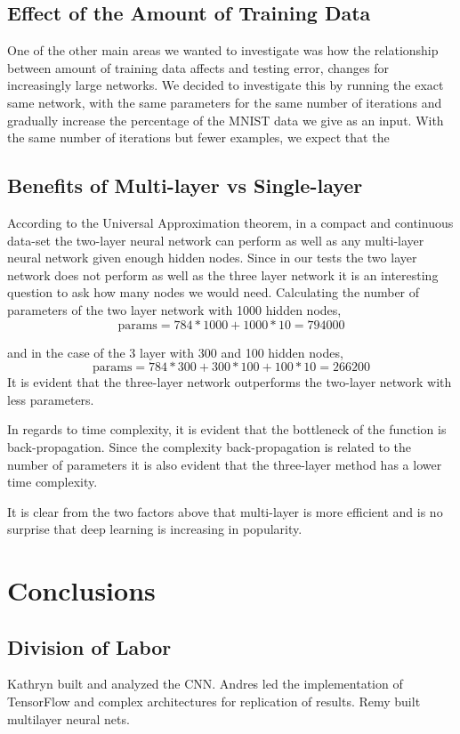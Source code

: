 \documentclass[12pt, twocolumn]{article}
\begin{document}
\subsection{Effect of the Amount of Training Data}
One of the other main areas we wanted to investigate was how the relationship between amount of training data affects and testing error, changes for increasingly large networks. We decided to investigate this by running the exact same network, with the same parameters for the same number of iterations and gradually increase the percentage of the MNIST data we give as an input. With the same number of iterations but fewer examples, we expect that the  



\subsection{Benefits of Multi-layer vs Single-layer}
According to the Universal Approximation theorem, in a compact and continuous data-set the two-layer neural network can perform as well as any multi-layer neural network given enough hidden nodes. Since in our tests the two layer network does not perform as well as the three layer network it is an interesting question to ask how many nodes we would need. Calculating the number of parameters of the two layer network with 1000 hidden nodes, 
\begin{equation*}
\textrm{params} = 784*1000 + 1000* 10 = 794000
\end{equation*}

and in the case of the 3 layer with 300 and 100 hidden nodes,
\begin{equation*}
\textrm{params} = 784*300 + 300*100 + 100* 10 = 266200
\end{equation*}
It is evident that the three-layer network outperforms the two-layer network with less parameters. 

In regards to time complexity, it is evident that the bottleneck of the function is back-propagation. Since the complexity back-propagation is related to the number of parameters it is also evident that the three-layer method has a lower time complexity.

It is clear from the two factors above that multi-layer is more efficient and is no surprise that deep learning is increasing in popularity.


\section{Conclusions}





\subsection{Division of Labor}
Kathryn built and analyzed the CNN. 
Andres led the implementation of TensorFlow and complex architectures for replication of results.
Remy built multilayer neural nets. 



\end{document}

